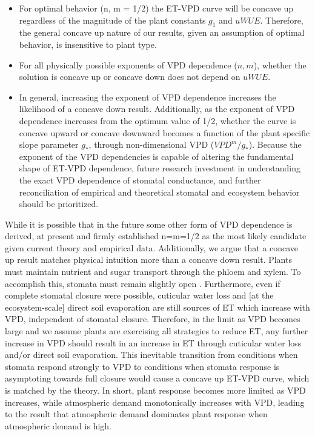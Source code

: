 \begin{itemize}
  \item For optimal behavior (n, m = 1/2) the ET-VPD curve will be
    concave up regardless of the magnitude of the plant constants
    $g_1$ and $uWUE$. Therefore, the general concave up nature of our
    results, given an assumption of optimal behavior, is insensitive
    to plant type.
  \item For all physically possible exponents of VPD dependence ($n,
    m$), whether the solution is concave up or concave down does not
    depend on $uWUE$.
  \item In general, increasing the exponent of VPD dependence
    increases the likelihood of a concave down result. Additionally, as
    the exponent of VPD dependence increases from the optimum value of
    1/2, whether the curve is concave upward or concave downward
    becomes a function of the plant specific slope parameter $g_*$,
    through non-dimensional VPD ($VPD^m/g_*$). Because the exponent of
    the VPD dependencies is capable of altering the fundamental shape
    of ET-VPD dependence, future research investment in understanding
    the exact VPD dependence of stomatal conductance, and further
    reconciliation of empirical and theoretical stomatal and
    ecosystem behavior should be prioritized.
\end{itemize}

While it is possible that in the future some other form of
VPD dependence is derived, at present \cite{MEDLYN_2011} and
\cite{Zhou_2014} firmly established n=m=1/2 as the most likely
candidate given current theory and empirical data. Additionally, we
argue that a concave up result matches physical intuition more than a
concave down result. Plants must maintain nutrient and sugar transport
through the phloem and xylem. To accomplish this, stomata must remain
slightly open \citep{De_2013, Nikinmaa_2013, Ryan_2014}. Furthermore,
even if complete stomatal closure were possible, cuticular water loss
and [at the ecosystem-scale] direct soil evaporation are still sources
of ET which increase with VPD, independent of stomatal
closure. Therefore, in the limit as VPD becomes large and we assume
plants are exercising all strategies to reduce ET, any further increase
in VPD should result in an increase in ET through cuticular water loss
and/or direct soil evaporation. This inevitable transition from
conditions when stomata respond strongly to VPD to conditions when
stomata response is asymptoting towards full closure would cause a
concave up ET-VPD curve, which is matched by the theory. In short,
plant response becomes more limited as VPD increases, while
atmospheric demand monotonically increases with VPD, leading to the
 result that atmospheric demand dominates plant response when
atmospheric demand is high.

